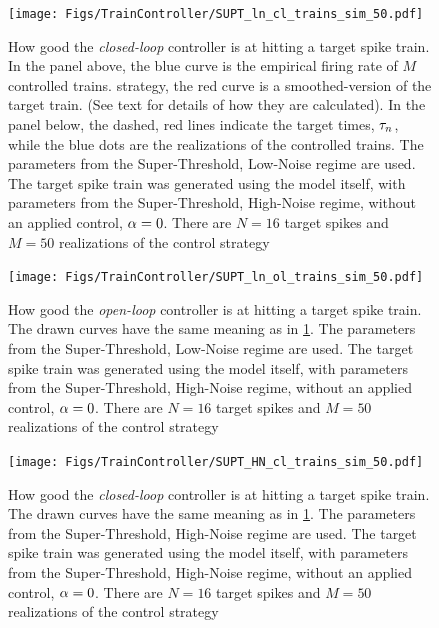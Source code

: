 \documentclass[12pt]{iopart}
\begin{document}
\begin{figure}[htp]
\begin{center}
  \texttt{[image: Figs/TrainController/SUPT\_ln\_cl\_trains\_sim\_50.pdf]}
  \caption[ ]{How good the {\sl closed-loop} controller is at hitting a target
  spike train. In the panel above, the blue curve is the empirical firing
  rate of $M$ controlled trains.   strategy, the red curve is a
  smoothed-version of the target train. (See text for details of how they are calculated). In the panel below, the
  dashed, red lines indicate the target times, ${\tau}_n$, while the blue dots are
  the realizations of the controlled trains.  
  The parameters from the Super-Threshold, Low-Noise
  regime are used. The target spike train was generated using the model itself,
  with parameters from the Super-Threshold, High-Noise regime, without an applied
  control, ${\alpha}=0$.
  There are $N=16$ target spikes and $M=50$ realizations of the control strategy} 
  \label{fig:targettrain_cl_lownoise}
\end{center}
\end{figure}  
\begin{figure}[htp] 
\begin{center}
  \texttt{[image: Figs/TrainController/SUPT\_ln\_ol\_trains\_sim\_50.pdf]}
  \caption[ ]{How good the {\sl open-loop} controller is at hitting a target
  spike train.
  The drawn curves have  the same meaning as in
  \cref{fig:targettrain_cl_lownoise}.
  The parameters from the Super-Threshold, Low-Noise regime are used. 
  The target spike train was generated using the model itself, with parameters
  from the Super-Threshold, High-Noise regime, without an applied control, ${\alpha}=0$.
  There are $N=16$ target spikes and $M=50$ realizations of the control strategy}
  \label{fig:targettrain_ol_lownoise}
\end{center} 
\end{figure}
\begin{figure}[htp]
\begin{center}
  \texttt{[image: Figs/TrainController/SUPT\_HN\_cl\_trains\_sim\_50.pdf]}
  \caption[ ]{How good the {\sl closed-loop} controller is at hitting a target
  spike train. 
  The drawn curves have  the same meaning as in
  \cref{fig:targettrain_cl_lownoise}.
  The parameters from the Super-Threshold, High-Noise regime
  are used. The target spike train was generated using the model itself, with
  parameters from the Super-Threshold, High-Noise regime, without an applied
  control, ${\alpha}=0$.
  There are $N=16$ target spikes and $M=50$ realizations of the control strategy}
  \label{fig:targettrain_cl_highnoise}
\end{center} 
\end{figure}
\end{document}
